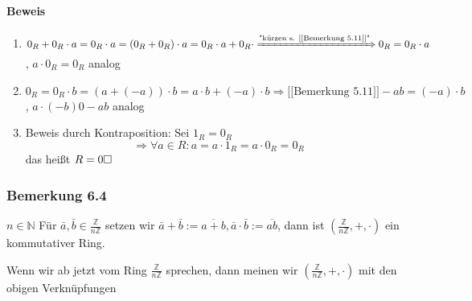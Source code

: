 \documentclass[a4paper]{scrartcl}
\DeclareMathOperator{\Forall}{\forall}
\theoremstyle{definition}
\theoremstyle{plain}
\theoremstyle{plain}
\theoremstyle{remark}
\theoremstyle{remark}
\theoremstyle{remark}
\begin{document}
\paragraph{Beweis}
\label{sec-3-2-3-1}
\begin{enumerate}
\item $0_R + 0_R\cdot a = 0_R\cdot a = (0_R + 0_R)\cdot a = 0_R\cdot a + 0_R\cdot \xRightarrow{\text{"kürzen s. [[Bemerkung 5.11]]"}} 0_R = 0_R \cdot a$, $a\cdot 0_R = 0_R$ analog
\item $0_R = 0_R\cdot b = (a + (-a))\cdot b = a\cdot b + (-a) \cdot b \Rightarrow{\text{[[Bemerkung 5.11]]}} - a b = (-a)\cdot b$, $a\cdot(-b) 0 -a b$ analog
\item Beweis durch Kontraposition: Sei $1_R = 0_R$
        \[\Rightarrow \Forall a\in R: a = a\cdot 1_R = a\cdot 0_R = 0_R\]
        das heißt $R = 0\hfill\square$
\end{enumerate}
\subsubsection{Bemerkung 6.4}
\label{sec-3-2-4}
$n\in\mathbb{N}$ Für $\bar a, \bar b \in\frac{\mathbb{Z}}{n\mathbb{Z}}$ setzen wir $\bar a + \bar b := \overline{a + b}, \bar a\cdot \bar b := \overline{ab}$, dann ist $(\frac{\mathbb{Z}}{n\mathbb{Z}},+,\cdot)$ ein kommutativer Ring.

Wenn wir ab jetzt vom Ring $\frac{\mathbb{Z}}{n\mathbb{Z}}$ sprechen, dann meinen wir $(\frac{\mathbb{Z}}{n\mathbb{Z}},+,\cdot)$ mit den obigen Verknüpfungen
\end{document}
